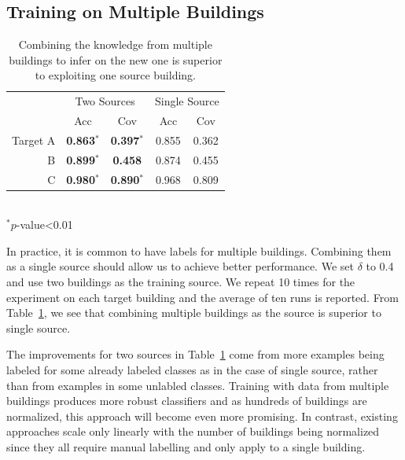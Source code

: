 \subsection{Training on Multiple Buildings}

\begin{table}[h]
\centering
\begin{tabular}{r|cc|cc}
\hline
\multirow{2}{*}{} & \multicolumn{2}{c|}{Two Sources} & \multicolumn{2}{c}{Single Source} \\ \cline{2-5} 
 & Acc & Cov & Acc & Cov \\ \hline
Target A & {\bf 0.863$^\ast$} & {\bf 0.397$^\ast$} & 0.855 & 0.362 \\ \hline
B & {\bf 0.899$^\ast$} & {\bf 0.458} & 0.874 & 0.455 \\ \hline
C & {\bf 0.980$^\ast$} & {\bf 0.890$^\ast$} & 0.968 & 0.809 \\ \hline
\end{tabular}
\\\noindent
$^\ast p$-value<0.01
\caption{Combining the knowledge from multiple buildings to infer on the new one is superior to exploiting one source building.}
\label{2source}
\end{table}

In practice, it is common to have labels for multiple buildings.  
Combining them as a single source should allow us to achieve better performance.
We set $\delta$ to 0.4 and use two buildings as the training source. %
We repeat 10 times for the experiment on each target building and the average of ten runs is reported.
From Table~\ref{2source}, we see that combining multiple buildings as the source is superior to single source.  %

The improvements for two sources in Table~\ref{2source} come from more examples being labeled for some already labeled classes as in the case of single source, rather than from examples in some unlabled classes. 
Training with data from multiple buildings produces more robust classifiers and as hundreds of buildings are normalized, this approach will become even more promising. 
In contrast, existing approaches scale only linearly with the number of buildings being normalized since they all require manual labelling and only apply to a single building.


